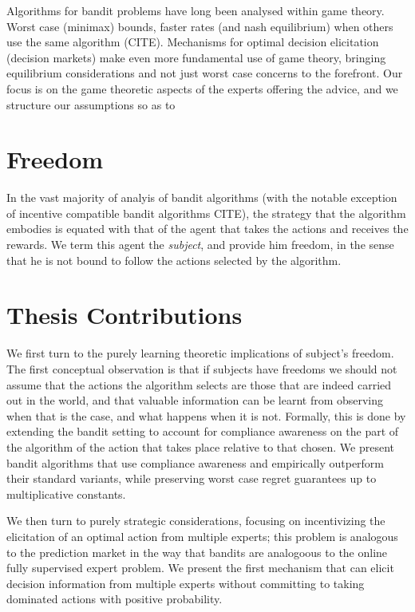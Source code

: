 Algorithms for bandit problems have long been analysed within game theory.
Worst case (minimax) bounds, faster rates (and nash equilibrium) when others use the same algorithm (CITE).
Mechanisms for optimal decision elicitation (decision markets) make even more fundamental use of game theory, bringing equilibrium considerations and not just worst case concerns to the forefront.
Our focus is on the game theoretic aspects of the experts offering the advice, and we structure our assumptions so as to 


\section{Freedom}

In the vast majority of analyis of bandit algorithms (with the notable exception of incentive compatible bandit algorithms CITE), the strategy that the algorithm embodies is equated with that of the agent that takes the actions and receives the rewards.
We term this agent the \emph{subject}, and provide him freedom, in the sense that he is not bound to follow the actions selected by the algorithm.


\section{Thesis Contributions}

We first turn to the purely learning theoretic implications of subject's freedom. The first conceptual observation is that if subjects have freedoms we should not assume that the actions the algorithm selects are those that are indeed carried out in the world, and that valuable information can be learnt from observing when that is the case, and what happens when it is not.
Formally, this is done by extending the bandit setting to account for compliance awareness on the part of the algorithm of the action that takes place relative to that chosen. We present bandit algorithms that use compliance awareness and empirically outperform their standard variants, while preserving worst case regret guarantees up to multiplicative constants. 

We then turn to purely strategic considerations, focusing on incentivizing the elicitation of an optimal action from multiple experts; this problem is analogous to the prediction market in the way that bandits are analogoous to the online fully supervised expert problem. 
We present the first mechanism that can elicit decision information from multiple experts without committing to taking dominated actions with positive probability. 

